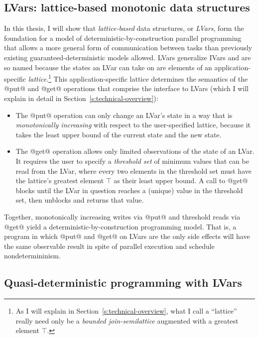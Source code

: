 \documentclass{article}
\begin{document}
\subsection{LVars: lattice-based monotonic data structures}

In this thesis, I will show that \emph{lattice-based} data structures,
or \emph{LVars}, form the foundation for a model of
deterministic-by-construction parallel programming that allows a more
general form of communication between tasks than previously existing
guaranteed-deterministic models allowed.  LVars generalize IVars and
are so named because the states an LVar can take on are elements of an
application-specific \emph{lattice}.\footnote{As I will explain in
  Section~\ref{s:technical-overview}, what I call a ``lattice'' really
  need only be a {\em bounded join-semilattice} augmented with a
  greatest element $\top$.}  This application-specific lattice
determines the semantics of the @put@ and @get@ operations that
comprise the interface to LVars (which I will explain in detail in
Section~\ref{s:technical-overview}):
\begin{itemize}
\item The @put@ operation can only change an LVar's state in a way
  that is {\em monotonically increasing} with respect to the
  user-specified lattice, because it takes the least upper bound of
  the current state and the new state.
\item The @get@ operation allows only limited observations of the
  state of an LVar.  It requires the user to specify a \emph{threshold
    set} of minimum values that can be read from the LVar, where every
  two elements in the threshold set must have the lattice's greatest
  element $\top$ as their least upper bound.  A call to @get@ blocks
  until the LVar in question reaches a (unique) value in the threshold
  set, then unblocks and returns that value.
\end{itemize}
Together, monotonically increasing writes via @put@ and threshold
reads via @get@ yield a deterministic-by-construction programming
model.  That is, a program in which @put@ and @get@ on LVars are the
only side effects will have the same observable result in spite of
parallel execution and schedule nondetermininism.

\subsection{Quasi-deterministic programming with LVars}
\end{document}
